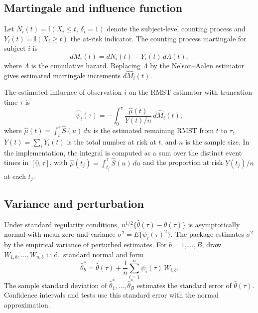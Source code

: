 \documentclass[11pt]{article}
\begin{document}
\subsection{Martingale and influence function}

Let $N_i(t) = \mathbb{I}(X_i \leq t,\, \delta_i = 1)$ denote the subject-level counting process and $Y_i(t) = \mathbb{I}(X_i \geq t)$ the at-risk indicator. The counting process martingale for subject $i$ is
\begin{equation}
  dM_i(t) = dN_i(t) - Y_i(t)\,d\Lambda(t),
\end{equation}
where $\Lambda$ is the cumulative hazard. Replacing $\Lambda$ by the Nelson--Aalen estimator gives estimated martingale increments $d\widehat{M}_i(t)$.

The estimated influence of observation $i$ on the RMST estimator with truncation time $\tau$ is
\begin{equation}
\hat{\psi}_i(\tau) = -\int_0^{\tau} \frac{\hat{\mu}(t)}{Y(t)/n}\,d\widehat{M}_i(t),
\end{equation}
where $\hat{\mu}(t) = \int_t^{\tau} \widehat{S}(u)\,du$ is the estimated remaining RMST from $t$ to $\tau$, $Y(t) = \sum_i Y_i(t)$ is the total number at risk at $t$, and $n$ is the sample size. In the implementation, the integral is computed as a sum over the distinct event times in $[0,\tau]$, with $\hat{\mu}(t_j) = \int_{t_j}^{\tau} \widehat{S}(u)\,du$ and the proportion at risk $Y(t_j)/n$ at each $t_j$.

\subsection{Variance and perturbation}

Under standard regularity conditions, $n^{1/2}\{\widehat{\theta}(\tau) - \theta(\tau)\}$ is asymptotically normal with mean zero and variance $\sigma^2 = E\{\psi_i(\tau)^2\}$. The package estimates $\sigma^2$ by the empirical variance of perturbed estimates. For $b = 1, \ldots, B$, draw $W_{1,b}, \ldots, W_{n,b}$ i.i.d.\ standard normal and form
\begin{equation}
  \widehat{\theta}_b^* = \widehat{\theta}(\tau) + \frac{1}{n}\sum_{i=1}^n \psi_i(\tau)\,W_{i,b}.
\end{equation}
The sample standard deviation of $\widehat{\theta}_1^*, \ldots, \widehat{\theta}_B^*$ estimates the standard error of $\widehat{\theta}(\tau)$. Confidence intervals and tests use this standard error with the normal approximation.
\end{document}
